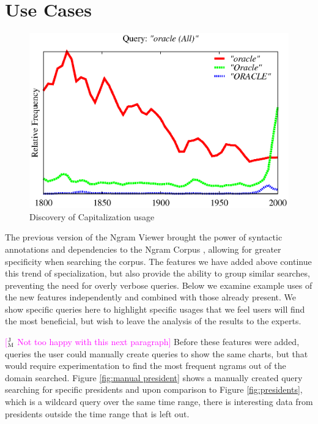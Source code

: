 \documentclass[11pt,a4paper]{article}
\newcommand{\jmcomment}[1]{\textcolor{magenta}{[$^{\textsc{J}}_{\textsc{M}}$ #1]}}
\begin{document}
\section{Use Cases}
\label{sec:usecases}
\begin{figure}
\centering
\includegraphics[width=\columnwidth]{graphs/oracle}
\caption{\label{fig:apple} Discovery of Capitalization usage}
\end{figure}
The previous version of the Ngram Viewer brought the power of syntactic annotations and dependencies to the Ngram Corpus \cite{lin2012syntactic}, allowing for greater specificity when searching the corpus. The features we have added above continue this trend of specialization, but also provide the ability to group similar searches, preventing the need for overly verbose queries. Below we examine example uses of the new features independently and combined with those already present. We show specific queries here to highlight specific usages that we feel users will find the most beneficial, but wish to leave the analysis of the results to the experts.


\jmcomment{Not too happy with this next paragraph}
Before these features were added, queries the user could manually create queries to show the same charts, but that would require experimentation to find the most frequent ngrams out of the domain searched. Figure \ref{fig:manual president} shows a manually created query searching for specific presidents and upon comparison to Figure \ref{fig:presidents}, which is a wildcard query over the same time range, there is interesting data from presidents outside the time range that is left out.
\end{document}
